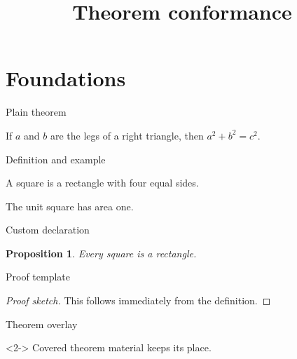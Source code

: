 \documentclass[aspectratio=169]{beamer}
\title{Theorem conformance}
\date{}
\newtheorem{proposition}[theorem]{Proposition}
\begin{document}
\section{Foundations}

\begin{frame}{Plain theorem}
  \begin{theorem}[Pythagoras]
    If \(a\) and \(b\) are the legs of a right triangle, then
    \(a^2+b^2=c^2\).
  \end{theorem}
\end{frame}

\begin{frame}{Definition and example}
  \begin{definition}
    A square is a rectangle with four equal sides.
  \end{definition}

  \begin{example}
    The unit square has area one.
  \end{example}
\end{frame}

\begin{frame}{Custom declaration}
  \begin{proposition}
    Every square is a rectangle.
  \end{proposition}
\end{frame}

\begin{frame}{Proof template}
  \begin{proof}[Proof sketch]
    This follows immediately from the definition.
  \end{proof}
\end{frame}

\begin{frame}{Theorem overlay}
  \begin{lemma}<2->
    Covered theorem material keeps its place.
  \end{lemma}
\end{frame}
\end{document}
